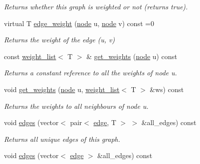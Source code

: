\begin{DoxyCompactItemize}
\begin{DoxyCompactList}\small\item\em Returns whether this graph is weighted or not (returns true). \end{DoxyCompactList}\item 
virtual T \hyperlink{classlgraph_1_1utils_1_1wxgraph_ae634779d8d7f973fb7b7d2d9fb33c5c2}{edge\+\_\+weight} (\hyperlink{namespacelgraph_1_1utils_a7bd66ede3805ef121bc2835bd48de0cf}{node} u, \hyperlink{namespacelgraph_1_1utils_a7bd66ede3805ef121bc2835bd48de0cf}{node} v) const =0
\begin{DoxyCompactList}\small\item\em Returns the weight of the edge ({\itshape u}, {\itshape v}) \end{DoxyCompactList}\item 
const \hyperlink{namespacelgraph_1_1utils_a11e7963f3637ea13778b8d3e69d2c17f}{weight\+\_\+list}$<$ T $>$ \& \hyperlink{classlgraph_1_1utils_1_1wxgraph_a06252e99191d39329947c3a5eef43e73}{get\+\_\+weights} (\hyperlink{namespacelgraph_1_1utils_a7bd66ede3805ef121bc2835bd48de0cf}{node} u) const 
\begin{DoxyCompactList}\small\item\em Returns a constant reference to all the weights of node {\itshape u}. \end{DoxyCompactList}\item 
void \hyperlink{classlgraph_1_1utils_1_1wxgraph_a23c629eb031e31681749da793f933548}{get\+\_\+weights} (\hyperlink{namespacelgraph_1_1utils_a7bd66ede3805ef121bc2835bd48de0cf}{node} u, \hyperlink{namespacelgraph_1_1utils_a11e7963f3637ea13778b8d3e69d2c17f}{weight\+\_\+list}$<$ T $>$ \&ws) const 
\begin{DoxyCompactList}\small\item\em Returns the weights to all neighbours of node {\itshape u}. \end{DoxyCompactList}\item 
void \hyperlink{classlgraph_1_1utils_1_1wxgraph_a73b6c8887d5088750ee2cc98c45089c6}{edges} (vector$<$ pair$<$ \hyperlink{namespacelgraph_1_1utils_a6510284ce1b1ae5dc97ce5d2de426e10}{edge}, T $>$ $>$ \&all\+\_\+edges) const 
\begin{DoxyCompactList}\small\item\em Returns all unique edges of this graph. \end{DoxyCompactList}\item 
void \hyperlink{classlgraph_1_1utils_1_1wxgraph_a6c58b1f9bd596b3a12c181119eee9da2}{edges} (vector$<$ \hyperlink{namespacelgraph_1_1utils_a6510284ce1b1ae5dc97ce5d2de426e10}{edge} $>$ \&all\+\_\+edges) const 

\end{DoxyCompactItemize}
